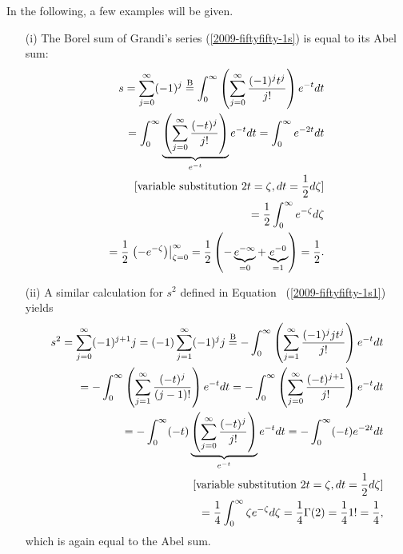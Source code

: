 {
\color{blue}
\bexample

In the following, a few examples will be given.

\begin{itemize}
\item[(i)]
The Borel sum
of Grandi's series (\ref{2009-fiftyfifty-1s})
is equal to its Abel sum:
\begin{equation}
\begin{split}
s= \sum_{j=0}^\infty (-1)^j
\stackrel{{\rm B}}{=}
\int_0^\infty \left(\sum_{j=0}^\infty   \frac{(-1)^j t^j}{j!}\right)   e^{-t} dt  \\
=
\int_0^\infty \underbrace{\left(\sum_{j=0}^\infty   \frac{(- t)^j}{j!}\right)}_{e^{-t}}   e^{-t} dt
=
\int_0^\infty    e^{-2t} dt  \\
[\textrm{variable substitution } 2t = \zeta, dt = \frac{1}{2} d \zeta ]\\
=
\frac{1}{2}
\int_0^\infty    e^{-\zeta } d\zeta      \\
=
\frac{1}{2}
\left.     \left(-e^{-\zeta }\right) \right|_{\zeta=0}^\infty
=
\frac{1}{2} \left(- \underbrace{e^{-\infty}}_{=0} + \underbrace{e^{-0}}_{=1}\right) = \frac{1}{2}
.
\end{split}
\end{equation}


\item[(ii)]
A similar calculation for $s^2$ defined in Equation~
(\ref{2009-fiftyfifty-1s1})
yields
\begin{equation}
\begin{split}
s^2= \sum_{j=0}^\infty (-1)^{j+1} j = (-1) \sum_{j=1}^\infty (-1)^j j
\stackrel{{\rm B}}{=}
-\int_0^\infty \left(\sum_{j=1}^\infty   \frac{(-1)^j j t^j}{j!}\right)   e^{-t} dt  \\
=
-\int_0^\infty \left(\sum_{j=1}^\infty   \frac{(-t)^j}{(j-1)!}\right)   e^{-t} dt
=
-\int_0^\infty \left(\sum_{j=0}^\infty   \frac{(-t)^{j+1}}{j!}\right)   e^{-t} dt  \\
=
-\int_0^\infty (-t) \underbrace{\left(\sum_{j=0}^\infty   \frac{(-t)^j}{j!}\right)}_{e^{-t}}   e^{-t} dt
=
-\int_0^\infty  (-t)  e^{-2t} dt  \\
[\textrm{variable substitution } 2t = \zeta, dt = \frac{1}{2} d \zeta ]\\
=
\frac{1}{4}
\int_0^\infty  \zeta  e^{-\zeta } d\zeta
=
\frac{1}{4}
\Gamma (2)
=
\frac{1}{4} 1! = \frac{1}{4}
,
\end{split}
\end{equation}
which is again equal to the Abel sum.




\end{itemize}}
